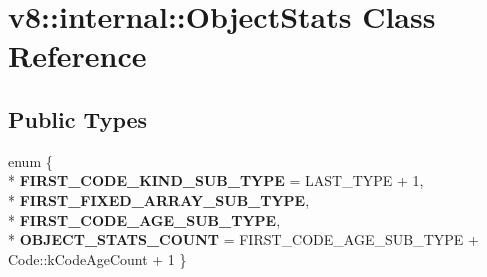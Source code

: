 \hypertarget{classv8_1_1internal_1_1_object_stats}{}\section{v8\+:\+:internal\+:\+:Object\+Stats Class Reference}
\label{classv8_1_1internal_1_1_object_stats}
\subsection*{Public Types}
\begin{DoxyCompactItemize}
\item 
enum \{ \\*
{\bfseries F\+I\+R\+S\+T\+\_\+\+C\+O\+D\+E\+\_\+\+K\+I\+N\+D\+\_\+\+S\+U\+B\+\_\+\+T\+Y\+PE} = L\+A\+S\+T\+\_\+\+T\+Y\+PE + 1, 
\\*
{\bfseries F\+I\+R\+S\+T\+\_\+\+F\+I\+X\+E\+D\+\_\+\+A\+R\+R\+A\+Y\+\_\+\+S\+U\+B\+\_\+\+T\+Y\+PE}, 
\\*
{\bfseries F\+I\+R\+S\+T\+\_\+\+C\+O\+D\+E\+\_\+\+A\+G\+E\+\_\+\+S\+U\+B\+\_\+\+T\+Y\+PE}, 
\\*
{\bfseries O\+B\+J\+E\+C\+T\+\_\+\+S\+T\+A\+T\+S\+\_\+\+C\+O\+U\+NT} = F\+I\+R\+S\+T\+\_\+\+C\+O\+D\+E\+\_\+\+A\+G\+E\+\_\+\+S\+U\+B\+\_\+\+T\+Y\+PE + Code\+:\+:k\+Code\+Age\+Count + 1
 \}\hypertarget{classv8_1_1internal_1_1_object_stats_a8cbf2e2797e8e002b39fe6252a0a06b7}{}\label{classv8_1_1internal_1_1_object_stats_a8cbf2e2797e8e002b39fe6252a0a06b7}

\end{DoxyCompactItemize}
